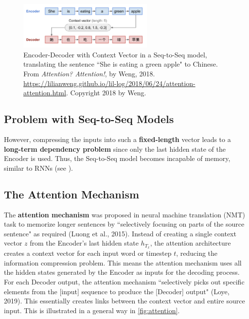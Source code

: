 \begin{figure}[h]
\vspace{-5pt}
\centering
\includegraphics[width=0.6\textwidth]{imgs/seqtoseq_greenapple.png}
\vspace{-5pt}
\caption{\footnotesize Encoder-Decoder with Context Vector in a Seq-to-Seq model, translating the sentence ``She is eating a green apple" to Chinese. From \emph{Attention? Attention!}, by Weng, 2018. \url{https://lilianweng.github.io/lil-log/2018/06/24/attention-attention.html}. Copyright 2018 by Weng.}
\vspace{-5pt}
\end{figure}


\subsection{Problem with Seq-to-Seq Models} \label{sec:ProblemWithSeq2Seq}

However, compressing the inputs into such a \textbf{fixed-length} vector leads to a \textbf{long-term dependency problem} since only the last hidden state of the Encoder is used. Thus, the Seq-to-Seq model becomes incapable of memory, similar to RNNs (see ). 

\subsection{The Attention Mechanism} \label{sec:AttentionMechanism}

The \textbf{attention mechanism} was proposed in neural machine translation (NMT) task to memorize longer sentences by ``selectively focusing on parts of the source sentence" as required (Luong et al., 2015). Instead of creating a single context vector $z$ from the Encoder's last hidden state $h_{T_x}$, the attention architecture creates a context vector for each input word or timestep $t$, reducing the information compression problem. This means the attention mechanism uses all the hidden states generated by the Encoder as inputs for the decoding process. For each Decoder output, the attention mechanism ``selectively picks out specific elements from the [input] sequence to produce the [Decoder] output" (Loye, 2019). This essentially creates links between the context vector and entire source input. This is illustrated in a general way in \cref{fig:attention}.

